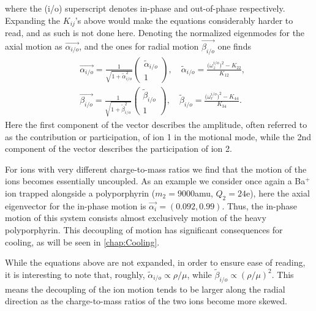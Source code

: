 where the (i/o) superscript denotes in-phase and out-of-phase respectively. Expanding the $K_{ij}$'s above would make the equations considerably harder to read, and as such is not done here. Denoting the normalized eigenmodes for the axial motion as $\vec{\alpha_{i/o}}$, and the ones for radial motion $\vec{\beta_{i/o}}$ one finds
\begin{align}
    &\vec{\alpha_{i/o}} = \frac{1}{\sqrt{1+\tilde{\alpha}_{i/o}^2}}
    \begin{pmatrix}
        \tilde{\alpha}_{i/o} \\
        1
    \end{pmatrix},\quad \tilde{\alpha}_{i/o} = \frac{\big(\omega_z^{i/o}\big)^2-K_{22}}{K_{12}},\\
    &\vec{\beta_{i/o}} = \frac{1}{\sqrt{1+\tilde{\beta}_{i/o}^2}}
    \begin{pmatrix}
        \tilde{\beta}_{i/o} \\
        1
    \end{pmatrix},\quad \tilde{\beta}_{i/o} = \frac{\big(\omega_r^{i/o}\big)^2-K_{44}}{K_{34}}.
\end{align}
Here the first component of the vector describes the amplitude, often referred to as the contribution or participation, of ion 1 in the motional mode, while the 2nd component of the vector describes the participation of ion 2.


For ions with very different charge-to-mass ratios we find that the motion of the ions becomes essentially uncoupled. As an example we consider once again a Ba$^+$ ion trapped alongside a polyporphyrin ($m_2 = 9000$amu, $Q_2 = 24$e), here the axial eigenvector for the in-phase motion is $\vec{\alpha_{i}} = (0.092,0.99)$. Thus, the in-phase motion of this system consists almost exclusively motion of the heavy polyporphyrin. This decoupling of motion has significant consequences for cooling, as will be seen in \cref{chap:Cooling}.


While the equations above are not expanded, in order to ensure ease of reading, it is interesting to note that, roughly, $\tilde{\alpha}_{i/o}\propto\rho/\mu$, while $\tilde{\beta}_{i/o}\propto(\rho/\mu)^2$. This means the decoupling of the ion motion tends to be larger along the radial direction as the charge-to-mass ratios of the two ions become more skewed.
